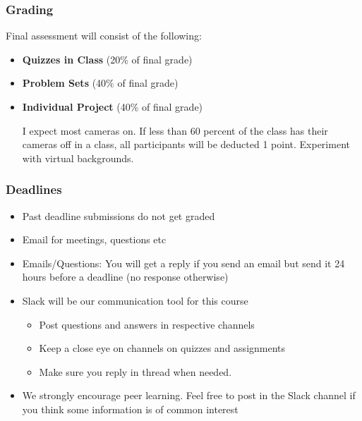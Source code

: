 \documentclass[compress, aspectratio=54]{beamer}
\begin{document}


\begin{frame}
\frametitle{Grading}
Final assessment will consist of the following:
\begin{itemize}
\item \textbf{Quizzes in Class} (20\% of final grade)
\item \textbf{Problem Sets} (40\% of final grade)
\item \textbf{Individual Project}  (40\% of final grade)

I expect most cameras on. If less than 60 percent of the class has their cameras off in a class, all participants will be deducted 1 point. Experiment with virtual backgrounds.
\end{itemize}
\end{frame}




\begin{frame}
\frametitle{Deadlines}

\begin{itemize}
\item Past deadline submissions do not get graded
\item Email for meetings, questions etc 
\item Emails/Questions: You will get a reply if you send an email but send it 24 hours before a deadline (no response otherwise)
\item Slack will be our communication tool for this course
\begin{itemize}
\item Post questions and answers in respective channels
\item Keep a close eye on channels on quizzes and assignments
\item Make sure you reply in thread when needed.
\end{itemize}
\item We strongly encourage peer learning. Feel free to post in the Slack channel if you think some information is of common interest
\end{itemize}

\end{frame}
\end{document}
